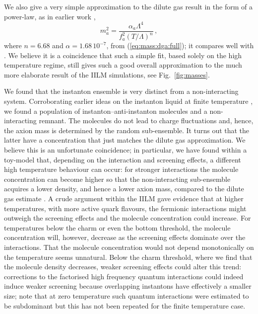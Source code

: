 \documentclass[preprint,nofootinbib]{revtex4}
\newcommand{\reffig}[1]{Fig.~\ref{#1}}
\begin{document}
We also give a very simple approximation to the dilute gas result in the form of a power-law, as in earlier work \cite{turner:axion:cosmology,bae:huh:kim:axion},
\begin{equation}
 m^2_a = \frac{\alpha_a \Lambda^4}{f_a^2 (T/\Lambda)^n}\,,\label{eq:mass:dga}
\end{equation}
where $n=6.68$ and $\alpha=1.68 \,10^{-7}$, from (\ref{eq:mass:dga:full}); it compares well with \cite{bae:huh:kim:axion}. We believe it is a coincidence that such a simple fit, based solely on the high temperature regime, still gives such a good overall approximation to the much more elaborate result of the IILM simulations, see \reffig{fig:masses}.

We found that the instanton ensemble is very distinct from a non-interacting system. Corroborating earlier ideas on the instanton liquid at finite temperature \cite{wantz:iilm:3}, we found a population of instanton--anti-instanton molecules and a non-interacting remnant. The molecules do not lead to charge fluctuations and, hence, the axion mass is determined by the random sub-ensemble. It turns out that the latter have a concentration that just matches the dilute gas approximation. We believe this is an unfortunate coincidence; in particular, we have found within a toy-model that, depending on the interaction and screening effects, a different high temperature behaviour can occur: for stronger interactions the molecule concentration can become higher so that the non-interacting sub-ensemble acquires a lower density, and hence a lower axion mass, compared to the dilute gas estimate \cite{wantz:iilm:3}. A crude argument within the IILM gave evidence that at higher temperatures, with more active quark flavours, the fermionic interactions might outweigh the screening effects and the molecule concentration could increase. For temperatures below the charm or even the bottom threshold, the molecule concentration will, however, decrease as the screening effects dominate over the interactions. That the molecule concentration would not depend monotonically on the temperature seems unnatural. Below the charm threshold, where we find that the molecule density decreases, weaker screening effects could alter this trend: corrections to the factorised high frequency quantum interactions could indeed induce weaker screening because overlapping instantons have effectively a smaller size; note that at zero temperature such quantum interactions were estimated to be subdominant but this has not been repeated for the finite temperature case.
\end{document}
